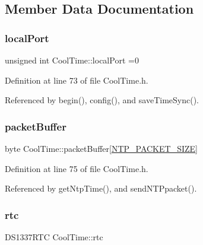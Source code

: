 \subsection{Member Data Documentation}
\mbox{\label{classCoolTime_a2f777da44d7ba678be8185299e9b49d1}} 
\subsubsection{\texorpdfstring{local\+Port}{localPort}}
{\footnotesize\ttfamily unsigned int Cool\+Time\+::local\+Port =0\hspace{0.3cm}{\ttfamily [private]}}



Definition at line 73 of file Cool\+Time.\+h.



Referenced by begin(), config(), and save\+Time\+Sync().

\mbox{\label{classCoolTime_a27e6abc82a5c2f72161956967005bec7}} 
\subsubsection{\texorpdfstring{packet\+Buffer}{packetBuffer}}
{\footnotesize\ttfamily byte Cool\+Time\+::packet\+Buffer\mbox{[}\hyperlink{CoolTime_8h_a56a6ea64006651b4f42adf713e244f06}{N\+T\+P\+\_\+\+P\+A\+C\+K\+E\+T\+\_\+\+S\+I\+ZE}\mbox{]}\hspace{0.3cm}{\ttfamily [private]}}



Definition at line 75 of file Cool\+Time.\+h.



Referenced by get\+Ntp\+Time(), and send\+N\+T\+Ppacket().

\mbox{\label{classCoolTime_abd38f2384ff90692b1568d9db869412e}} 
\subsubsection{\texorpdfstring{rtc}{rtc}}
{\footnotesize\ttfamily D\+S1337\+R\+TC Cool\+Time\+::rtc\hspace{0.3cm}{\ttfamily [private]}}



